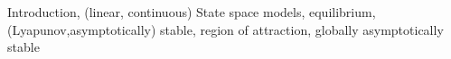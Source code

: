 Introduction, (linear, continuous) State space models, equilibrium, (Lyapunov,asymptotically) stable, region of attraction, globally asymptotically stable 